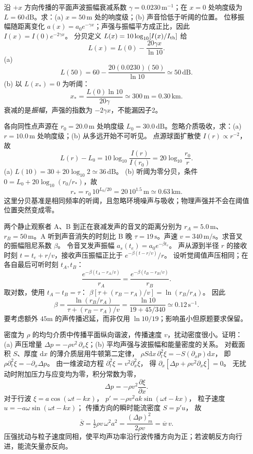 沿 $+x$ 方向传播的平面声波振幅衰减系数 $\gamma=0.0230\,\mathrm{m^{-1}}$；在 $x=0$ 处响度级为 $L=60\,\mathrm{dB}$。求：(a) $x=50\,\mathrm m$ 处的响度级；(b) 声音恰低于听阈的位置。
\exsolution
位移振幅随距离变化 $a(x)=a_0e^{-\gamma x}$；声强与振幅平方成正比，因此 $I(x)=I(0)e^{-2\gamma x}$。
分贝定义 $L(x)=10\log_{10}[I(x)/I_{\rm th}]$ 给
\[
L(x)=L(0)-\frac{20\gamma x}{\ln10}.
\]
(a)
\[
\boxed{L(50)=60-\frac{20(0.0230)(50)}{\ln10}
\simeq50\,\mathrm{dB}}.
\]
(b) 以 $L(x_*)=0$ 为听阈：
\[
\boxed{x_*=\frac{L(0)\ln10}{20\gamma}
\simeq300\,\mathrm m=0.30\,\mathrm{km}}.
\]
\excheck 衰减的是\emph{振幅}，声强的指数为 $-2\gamma x$，不能漏因子2。

各向同性点声源在 $r_0=20.0\,\mathrm m$ 处响度级 $L_0=30.0\,\mathrm{dB}$。忽略介质吸收，求：(a) $r=10.0\,\mathrm m$ 处响度级；(b) 从多远开始不可听见。
\exsolution
点源球面扩散使 $I(r)\propto r^{-2}$，故
\[
L(r)-L_0=10\log_{10}\frac{I(r)}{I(r_0)}
=20\log_{10}\frac{r_0}{r}.
\]
(a)
$\boxed{L(10)=30+20\log_{10}2
\simeq36\,\mathrm{dB}}$。
(b) 听阈为零分贝，条件
$0=L_0+20\log_{10}(r_0/r_*)$，故
\[
\boxed{r_*=r_0\,10^{L_0/20}
=20\,10^{1.5}\,\mathrm m
\simeq0.63\,\mathrm{km}}.
\]
\excheck 这里分贝基准是相同频率的听阈，且忽略环境噪声与吸收；物理声强并不会在阈值位置突然变成零。

两个静止观察者 A、B 到正在衰减发声的音叉的距离分别为 $r_A=5.0\,\mathrm m$、$r_B=50\,\mathrm m$。A 听到声音消失的时刻比 B 晚 $\tau=19\,\mathrm s$。声速 $v=340\,\mathrm{m/s}$。求音叉的振幅阻尼系数 $\beta$。
\exsolution
令音叉发声振幅 $a_s(t_e)=a_0e^{-\beta t_e}$。
声从源到半径 $r$ 的接收时刻 $t=t_e+r/v$，接收声压振幅正比于
$e^{-\beta(t-r/v)}/r$。
设听觉阈值声压相同；在各自最后可听时刻 $t_A,t_B$：
\[
\frac{e^{-\beta(t_A-r_A/v)}}{r_A}
=\frac{e^{-\beta(t_B-r_B/v)}}{r_B}.
\]
取对数，使用 $t_A-t_B=\tau$：
$\beta[\tau+(r_B-r_A)/v]=\ln(r_B/r_A)$。
因此
\[
\boxed{\beta=\frac{\ln(r_B/r_A)}
{\tau+(r_B-r_A)/v}
=\frac{\ln10}{19+45/340}
\simeq0.12\,\mathrm{s^{-1}}}.
\]
\excheck 要考虑额外 $45$m 的声传播迟延，而非仅用 $\ln10/19$；影响虽小但原题要求保留。

密度为 $\rho$ 的均匀介质中传播平面纵向谐波，传播速度 $v$，扰动密度很小。证明：(a) 声压增量 $\Delta p=-\rho v^2\,\partial_x\xi$；(b) 平均声强与波振幅和能量密度的关系。
\exsolution
对截面积 $S$、厚度 $\mathrm dx$ 的薄介质层用牛顿第二定律，
$\rho S\mathrm dx\,\partial_t^2\xi=-S(\partial_xp)\mathrm dx$，
即
$\rho\partial_t^2\xi=-\partial_x\Delta p$。
由一维波动方程
$\partial_t^2\xi=v^2\partial_x^2\xi$，
得
$\partial_x[\Delta p+\rho v^2\partial_x\xi]=0$。
无扰动时附加压力与应变均为零，积分常数为零，
\[
\boxed{\Delta p=-\rho v^2\frac{\partial\xi}{\partial x}}.
\]
对于行波 $\xi=a\cos(\omega t-kx)$，
$p'= -\rho v^2ak\sin(\omega t-kx)$，
粒子速度 $u=-a\omega\sin(\omega t-kx)$；
传播方向的瞬时能流密度 $S=p'u$，
故
\[
\boxed{\overline S
=\tfrac12\rho v\,\omega^2a^2
=\frac{(\Delta p)_m^2}{2\rho v}
=\overline w\,v}.
\]
\excheck 压强扰动与粒子速度同相，使平均声功率沿行波传播方向为正；若波朝反方向行进，能流矢量亦反向。


